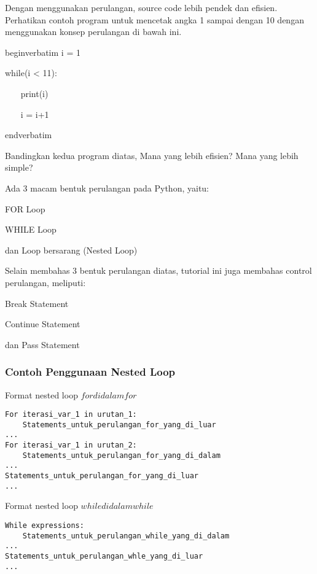 Dengan menggunakan perulangan, source code lebih pendek dan efisien. Perhatikan contoh program untuk mencetak angka 1 sampai dengan 10 dengan menggunakan konsep perulangan di bawah ini.\vspace{\baselineskip}
\vspace{\baselineskip}
 \par
\vspace{12pt}

begin{verbatim}
i = 1 \par
while(i < 11): \par
~~~ print(i) \par
~~~ i = i+1 \par
end{verbatim}
\vspace{\baselineskip}

Bandingkan kedua program diatas, Mana yang lebih efisien? Mana yang lebih simple?\vspace{\baselineskip}
\vspace{\baselineskip}

Ada 3 macam bentuk perulangan pada Python, yaitu: \par
FOR Loop \par
WHILE Loop \par
dan Loop bersarang (Nested Loop) \par
\vspace{\baselineskip}

Selain membahas 3 bentuk perulangan diatas, tutorial ini juga membahas control perulangan, meliputi: \par
Break Statement \par
Continue Statement \par
dan Pass Statement \par
\vspace{\baselineskip}
\vspace{12pt}

\subsubsection{Contoh Penggunaan Nested Loop}
Format nested loop \(for di dalam for\)
\begin{verbatim}
For iterasi_var_1 in urutan_1:
	Statements_untuk_perulangan_for_yang_di_luar
...
For iterasi_var_1 in urutan_2:
	Statements_untuk_perulangan_for_yang_di_dalam
...
Statements_untuk_perulangan_for_yang_di_luar
...
\end{verbatim}

Format nested loop \(while di dalam while\)
\begin{verbatim}
While expressions:
	Statements_untuk_perulangan_while_yang_di_dalam
...
Statements_untuk_perulangan_whle_yang_di_luar
...
\end{verbatim}

